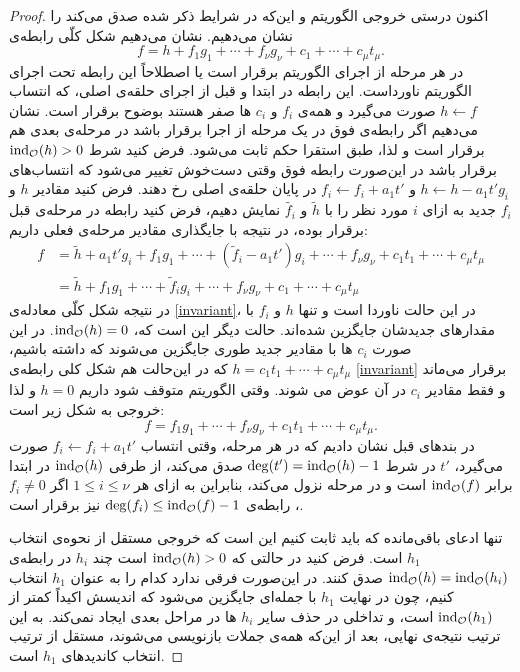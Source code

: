 \begin{proposition}
\begin{proof}
 اکنون درستی خروجی الگوریتم و این‌که در شرایط ذکر شده صدق می‌کند را نشان می‌دهیم. نشان می‌دهیم شکل کلّی رابطه‌ی 
 \begin{equation}
 \label{invariant}
 f = h + f_{1}g_{1} + \cdots + f_{\nu}g_{\nu} + c_{1} + \cdots + c_{\mu}t_{\mu}.
  \end{equation}
 در هر مرحله از اجرای الگوریتم برقرار است یا اصطلاحاً  این رابطه تحت اجرای الگوریتم ناورداست.  این رابطه در ابتدا و قبل از اجرای حلقه‌ی اصلی،  که انتساب 
 $h\gets f$
 صورت می‌گیرد و همه‌ی 
 $f_{i}$
 و
 $c_{i}$
 ها صفر هستند بوضوح برقرار است. نشان می‌دهیم اگر رابطه‌ی فوق در یک مرحله از اجرا برقرار باشد در مرحله‌ی بعدی هم برقرار است و لذا، طبق استقرا حکم ثابت می‌شود.  فرض کنید شرط 
 $\operatorname{\mathrm{ind}}_{{\mathcal O}}(h) > 0$
برقرار باشد در این‌صورت رابطه فوق وقتی دست‌خوش تغییر می‌شود که انتساب‌های 
 $h\gets h - a_{1}t'g_{i}$
 و
 $f_{i}\gets f_{i} + a_{1}t'$
 در پایان حلقه‌ی اصلی رخ دهند. فرض کنید مقادیر 
 $h$
 و
 $f_{i}$
 جدید به ازای 
 $i$
 مورد نظر را با 
 $\tilde{h}$
 و
 $\tilde{f_{i}}$
نمایش دهیم، فرض کنید رابطه در مرحله‌ی قبل برقرار بوده، در نتیجه با جایگذاری مقادیر مرحله‌ی  فعلی داریم:
\begin{align*}
f &= \tilde{h} + a_{1}t'g_{i} + f_{1}g_{1}+\cdots +(\tilde{f}_{i} - a_{1}t') g_{i} + \cdots + f_{\nu}g_{\nu} + c_{1}t_{1}+ \cdots+ c_{\mu}t_{\mu}\\
 &= \tilde{h} + f_{1}g_{1} + \cdots +\tilde{f}_{i}g_{i}+\cdots+ f_{\nu}g_{\nu} + c_{1} + \cdots + c_{\mu}t_{\mu}
\end{align*}
در نتیجه شکل کلّی معادله‌ی 
\ref{invariant}،
 در این حالت ناوردا است و تنها 
$h$
و
$f_{i}$
با مقدار‌های جدیدشان جایگزین شده‌اند. حالت دیگر این است که،
$\operatorname{\mathrm{ind}}_{{\mathcal O}}(h) = 0$.
در این صورت 
$c_{i}$
ها با مقادیر جدید طوری جایگزین می‌شوند که داشته باشیم، 
$h = c_{1}t_{1} + \cdots+ c_{\mu}t_{\mu}$
که در این‌حالت هم شکل کلی رابطه‌ی 
\ref{invariant}
برقرار می‌ماند و فقط مقادیر  
$c_{i}$
در آن عوض می شوند. وقتی الگوریتم متوقف شود داریم 
$h = 0$
و لذا خروجی به شکل زیر است:
$$f  = f_{1}g_{1} +\cdots+f_{\nu}g_{\nu} + c_{1}t_{1} + \cdots + c_{\mu}t_{\mu}.$$
در بند‌های قبل نشان دادیم که در هر مرحله، وقتی انتساب 
$f_{i}\gets f_{i} + a_{1}t'$
صورت می‌گیرد، 
$t'$
در شرط 
$\deg(t') = \operatorname{\mathrm{ind}}_{{\mathcal O}}(h) - 1$
صدق می‌کند، از طرفی 
$\operatorname{\mathrm{ind}}_{{\mathcal O}}(h)$
در ابتدا برابر 
$\operatorname{\mathrm{ind}}_{{\mathcal O}}(f)$
است و در مرحله نزول می‌کند، بنابراین به ازای هر 
$1\leq i\leq \nu$
اگر 
$f_{i}\neq 0$،
رابطه‌ی 
$\deg(f_{i})\leq \operatorname{\mathrm{ind}}_{{\mathcal O}}(f) - 1$
نیز برقرار است.


تنها ادعای باقی‌مانده که باید ثابت کنیم این است که خروجی  مستقل از نحوه‌ی انتخاب 
$h_{1}$
است. فرض کنید در حالتی که 
$\operatorname{\mathrm{ind}}_{{\mathcal O}}(h)>0$ 
است چند
$h_{i}$
در رابطه‌ی 
$\operatorname{\mathrm{ind}}_{{\mathcal O}}(h) = \operatorname{\mathrm{ind}}_{{\mathcal O}}(h_{i})$
صدق کنند. در این‌صورت فرقی ندارد کدام را به عنوان 
$h_{1}$
انتخاب کنیم، چون در نهایت 
$h_{1}$
با جمله‌ای جایگزین می‌شود که اندیسش اکیداً کمتر از 
$\operatorname{\mathrm{ind}}_{{\mathcal O}}(h_{1})$
است، و تداخلی در حذف سایر 
$h_{i}$
ها در مراحل بعدی ایجاد نمی‌کند. به این ترتیب نتیجه‌ی نهایی، بعد از این‌که همه‌ی جملات بازنویسی می‌شوند، مستقل از ترتیب انتخاب کاندید‌های 
$h_{1}$
است.
\end{proof}
\end{proposition}
